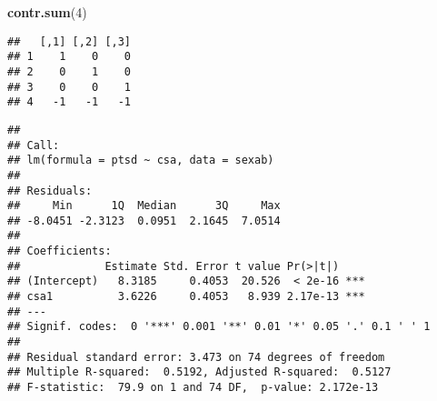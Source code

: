 \documentclass[
]{article}
\newenvironment{Shaded}{\begin{snugshade}}{\end{snugshade}}
\newcommand{\CommentTok}[1]{\textcolor[rgb]{0.56,0.35,0.01}{\textit{#1}}}
\newcommand{\DataTypeTok}[1]{\textcolor[rgb]{0.13,0.29,0.53}{#1}}
\newcommand{\DecValTok}[1]{\textcolor[rgb]{0.00,0.00,0.81}{#1}}
\newcommand{\KeywordTok}[1]{\textcolor[rgb]{0.13,0.29,0.53}{\textbf{#1}}}
\newcommand{\NormalTok}[1]{#1}
\newcommand{\OperatorTok}[1]{\textcolor[rgb]{0.81,0.36,0.00}{\textbf{#1}}}
\newcommand{\StringTok}[1]{\textcolor[rgb]{0.31,0.60,0.02}{#1}}
\begin{document}
\begin{Shaded}
\begin{Highlighting}[]
\KeywordTok{contr.sum}\NormalTok{(}\DecValTok{4}\NormalTok{)}
\end{Highlighting}
\end{Shaded}

\begin{verbatim}
##   [,1] [,2] [,3]
## 1    1    0    0
## 2    0    1    0
## 3    0    0    1
## 4   -1   -1   -1
\end{verbatim}

\begin{Shaded}
\end{Shaded}

\begin{verbatim}
## 
## Call:
## lm(formula = ptsd ~ csa, data = sexab)
## 
## Residuals:
##     Min      1Q  Median      3Q     Max 
## -8.0451 -2.3123  0.0951  2.1645  7.0514 
## 
## Coefficients:
##             Estimate Std. Error t value Pr(>|t|)    
## (Intercept)   8.3185     0.4053  20.526  < 2e-16 ***
## csa1          3.6226     0.4053   8.939 2.17e-13 ***
## ---
## Signif. codes:  0 '***' 0.001 '**' 0.01 '*' 0.05 '.' 0.1 ' ' 1
## 
## Residual standard error: 3.473 on 74 degrees of freedom
## Multiple R-squared:  0.5192, Adjusted R-squared:  0.5127 
## F-statistic:  79.9 on 1 and 74 DF,  p-value: 2.172e-13
\end{verbatim}
\end{document}
